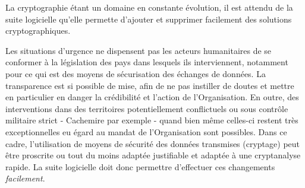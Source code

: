 La cryptographie étant un domaine en constante évolution, il est attendu de la suite logicielle qu'elle permette d'ajouter et supprimer facilement des solutions cryptographiques. 
\begin{constraint}
Les situations d'urgence ne dispensent pas les acteurs humanitaires de se conformer à la législation des pays dans lesquels ils interviennent, notamment pour ce qui est des moyens de sécurisation des échanges de données. La transparence est si possible de mise, afin de ne pas instiller de doutes et mettre en particulier en danger la crédibilité et l'action de l'Organisation. En outre, des interventions dans des territoires potentiellement conflictuels ou sous contrôle militaire strict - Cachemire par exemple - quand bien même celles-ci restent très exceptionnelles eu égard au mandat de l'Organisation sont possibles. Dans ce cadre, l'utilisation de moyens de sécurité des données transmises (cryptage) peut être proscrite ou tout du moins adaptée justifiable et adaptée à une cryptanalyse \og{}rapide\fg{}. La suite logicielle doit donc permettre d'effectuer ces changements \emph{facilement}.
\end{constraint}

